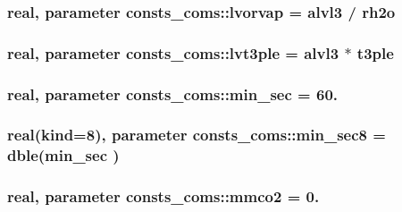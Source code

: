 \subsubsection[{\texorpdfstring{lvorvap}{lvorvap}}]{\setlength{\rightskip}{0pt plus 5cm}real, parameter consts\+\_\+coms\+::lvorvap = {\bf alvl3} / {\bf rh2o}}\hypertarget{namespaceconsts__coms_a6bb6a123479fd83c144d9fb138d78e6e}{}\label{namespaceconsts__coms_a6bb6a123479fd83c144d9fb138d78e6e}
\subsubsection[{\texorpdfstring{lvt3ple}{lvt3ple}}]{\setlength{\rightskip}{0pt plus 5cm}real, parameter consts\+\_\+coms\+::lvt3ple = {\bf alvl3} $\ast$ {\bf t3ple}}\hypertarget{namespaceconsts__coms_a1726b872fa55bc57ee0c68f0e60221f0}{}\label{namespaceconsts__coms_a1726b872fa55bc57ee0c68f0e60221f0}
\subsubsection[{\texorpdfstring{min\+\_\+sec}{min_sec}}]{\setlength{\rightskip}{0pt plus 5cm}real, parameter consts\+\_\+coms\+::min\+\_\+sec = 60.}\hypertarget{namespaceconsts__coms_a34e3f5c2fd6493a836a9797220b50639}{}\label{namespaceconsts__coms_a34e3f5c2fd6493a836a9797220b50639}
\subsubsection[{\texorpdfstring{min\+\_\+sec8}{min_sec8}}]{\setlength{\rightskip}{0pt plus 5cm}real(kind=8), parameter consts\+\_\+coms\+::min\+\_\+sec8 = dble({\bf min\+\_\+sec} )}\hypertarget{namespaceconsts__coms_a2b5ca6c06d8637515d08d6f29aa48060}{}\label{namespaceconsts__coms_a2b5ca6c06d8637515d08d6f29aa48060}
\subsubsection[{\texorpdfstring{mmco2}{mmco2}}]{\setlength{\rightskip}{0pt plus 5cm}real, parameter consts\+\_\+coms\+::mmco2 = 0.}\hypertarget{namespaceconsts__coms_ac39e12891c7cedb24326a132e7288337}{}\label{namespaceconsts__coms_ac39e12891c7cedb24326a132e7288337}
